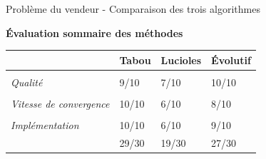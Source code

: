 \documentclass{beamer}
\begin{document}
\begin{frame}{Problème du vendeur - Comparaison des trois algorithmes}
  \begin{center}\textbf{Évaluation sommaire des méthodes}\end{center}
  \begin{table}
  \centering
  \begin{tabular}{C{2.6cm}C{2cm}C{2cm}C{2cm}}
  &\textbf{Tabou} & \textbf{Lucioles} & \textbf{Évolutif}\\
  \hline\\
  \textit{Qualité} & 9/10 & 7/10 & 10/10\\\\
  \textit{Vitesse de convergence} & 10/10 & 6/10 & 8/10\\\\
   \textit{Implémentation} & 10/10 & 6/10 & 9/10 \\
   \hline
      &29/30 & 19/30 & 27/30\\
  \end{tabular}
\end{table}
\end{frame}
\end{document}
